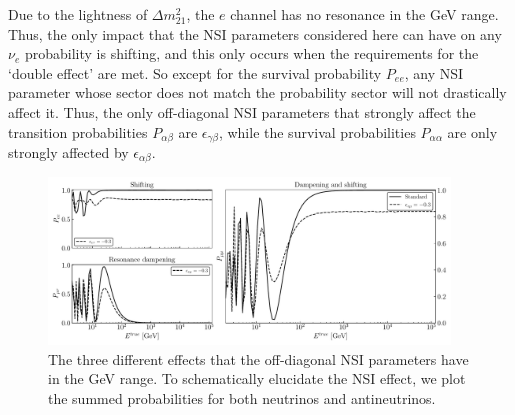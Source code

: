 \documentclass[draft=True]{revtex4-2}
\begin{document}
Due to the lightness of $\Delta m^2_{21}$, the $e$ channel has no resonance in the \si{\GeV} range. Thus, the only impact that 
the NSI parameters considered here can have on any $\nu_e$ probability is shifting, and this only occurs when the requirements for the `double effect'
are met. So except for the survival probability $P_{ee}$, any NSI parameter whose sector does not match the probability sector will not drastically affect it. 
Thus, the only off-diagonal NSI parameters that strongly affect the transition probabilities $P_{\alpha\beta}$ are $\epsilon_{\gamma\beta}$,
while the survival probabilities $P_{\alpha\alpha}$ are only strongly affected by $\epsilon_{\alpha\beta}$.
\begin{figure}
   \includegraphics[width=0.95\textwidth]{figures/nsi_probs.pdf}
   \caption{The three different effects that the off-diagonal NSI parameters have in 
   the \si{\GeV} range. To schematically elucidate the NSI effect, we plot the summed probabilities for both neutrinos and 
   antineutrinos.}\label{fig:nsi_probs}
\end{figure}%
\end{document}

